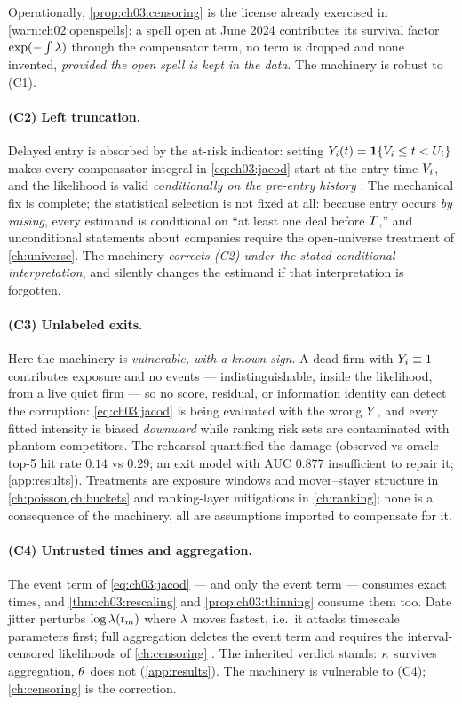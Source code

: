 Operationally, \cref{prop:ch03:censoring} is the license already
exercised in \cref{warn:ch02:openspells}: a spell open at June 2024
contributes its survival factor $\exp(-\int \lambda)$ through the
compensator term, no term is dropped and none invented, \emph{provided
the open spell is kept in the data}. The machinery is robust to (C1).

\paragraph{(C2) Left truncation.}
Delayed entry is absorbed by the at-risk indicator: setting
$Y_i(t) = \mathbf{1}\{V_i \le t < U_i\}$ makes every compensator
integral in \cref{eq:ch03:jacod} start at the entry time $V_i$, and
the likelihood is valid \emph{conditionally on the pre-entry history}
\citep{keiding1990,kalbfleisch2002}. The mechanical fix is complete; the
statistical selection is not fixed at all: because entry occurs
\emph{by raising}, every estimand is conditional on ``at least one deal
before $T$,'' and unconditional statements about companies require
the open-universe treatment of \cref{ch:universe}. The machinery
\emph{corrects (C2) under the stated conditional interpretation}, and
silently changes the estimand if that interpretation is forgotten.

\paragraph{(C3) Unlabeled exits.}
Here the machinery is \emph{vulnerable, with a known sign}. A dead firm
with $Y_i \equiv 1$ contributes exposure and no events ---
indistinguishable, inside the likelihood, from a live quiet firm --- so no
score, residual, or information identity can detect the corruption:
\cref{eq:ch03:jacod} is being evaluated with the wrong $Y$, and
every fitted intensity is biased \emph{downward} while ranking risk sets
are contaminated with phantom competitors. The rehearsal quantified the
damage (observed-vs-oracle top-5 hit rate $0.14$ vs $0.29$; an exit model
with AUC $0.877$ insufficient to repair it; \cref{app:results}).
Treatments are exposure windows and mover--stayer structure in
\cref{ch:poisson,ch:buckets} and ranking-layer mitigations in
\cref{ch:ranking}; none is a consequence of the machinery, all are
assumptions imported to compensate for it.

\paragraph{(C4) Untrusted times and aggregation.}
The event term of \cref{eq:ch03:jacod} --- and only the event term ---
consumes exact times, and \cref{thm:ch03:rescaling} and
\cref{prop:ch03:thinning} consume them too. Date jitter perturbs
$\log\lambda(t_m)$ where $\lambda$ moves fastest, i.e.\ it attacks timescale
parameters first; full aggregation deletes the event term and requires
the interval-censored likelihoods of \cref{ch:censoring}
\citep{rizoiu2022}. The inherited verdict stands: $\kappa$ survives
aggregation, $\theta$ does not (\cref{app:results}). The machinery is
vulnerable to (C4); \cref{ch:censoring} is the correction.

